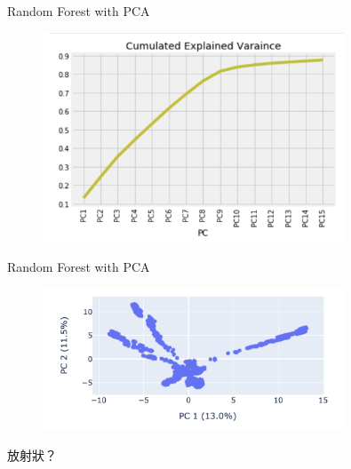 \documentclass[12pt]{beamer}
\begin{document}
\begin{frame}[fragile]{Random Forest with PCA}

	\begin{figure}
		\begin{center}
			\includegraphics[width=0.8\textwidth]{figure/plot/2c.png}
		\end{center}
	\end{figure}

\end{frame}


\begin{frame}[fragile]{Random Forest with PCA}

	\begin{figure}
		\begin{center}
			\includegraphics[width=0.8\textwidth]{figure/plot/2d.png}
		\end{center}
	\end{figure}

	放射狀？

\end{frame}
\end{document}
